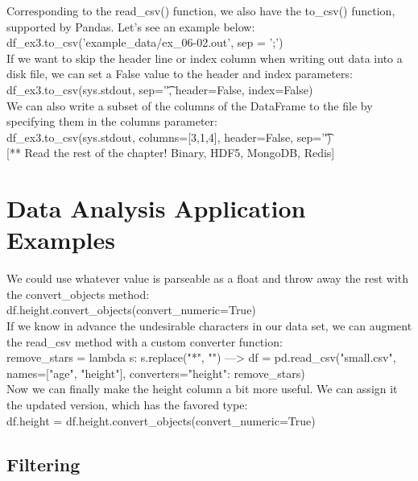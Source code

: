 \documentclass{article}
\numberwithin{equation}{section} %
\begin{document}
Corresponding to the read\_csv() function, we also have the to\_csv() function,
supported by Pandas. Let's see an example below: \\

df\_ex3.to\_csv('example\_data/ex\_06-02.out', sep = ';') \\

If we want to skip the header line or index column when writing out data into a disk
file, we can set a False value to the header and index parameters: \\

df\_ex3.to\_csv(sys.stdout, sep='\t', header=False, index=False) \\

We can also write a subset of the columns of the DataFrame to the file by specifying
them in the columns parameter: \\

df\_ex3.to\_csv(sys.stdout, columns=[3,1,4], header=False, sep='\t') \\


[** Read the rest of the chapter! Binary, HDF5, MongoDB, Redis]


\section{Data Analysis Application Examples}

We could use whatever value is parseable as a float and throw away the rest with the
convert\_objects method: \\

df.height.convert\_objects(convert\_numeric=True) \\

If we know in advance the undesirable characters in our data set, we can augment the read\_csv method with a custom converter function: \\

remove\_stars = lambda s: s.replace("*", "") ---> df = pd.read\_csv("small.csv", names=["age", "height"], converters={"height": remove\_stars}) \\

Now we can finally make the height column a bit more useful. We can assign it the
updated version, which has the favored type: \\

df.height = df.height.convert\_objects(convert\_numeric=True)


\subsection*{Filtering}
\end{document}
